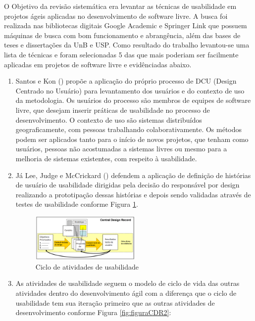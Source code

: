 O Objetivo da revisão sistemática era levantar as técnicas de usabilidade em projetos ágeis aplicadas no desenvolvimento de software livre. A busca foi realizada nas bibliotecas digitais Google Academic e Springer Link que possuem máquinas de busca com bom funcionamento e abrangência, além das bases de teses e dissertações da UnB e USP. Como resultado do trabalho levantou-se uma lista de técnicas e foram selecionadas 5 das que mais poderiam ser facilmente aplicadas em projetos de software livre e evidênciadas abaixo.

\begin{enumerate}
%
\item Santos e Kon (\citeyear{santoskon2009}) propõe a aplicação do próprio processo de DCU (Design Centrado no Usuário) para levantamento dos usuários e do contexto de uso da metodologia. Os usuários do processo são membros de equipes de software livre, que desejam inserir práticas de usabilidade no processo de desenvolvimento. O contexto de uso são sistemas distribuídos geograficamente, com pessoas trabalhando colaborativamente. Os métodos podem ser aplicados tanto para o início de novos projetos, que tenham como usuários, pessoas não acostumadas a sistemas livres ou mesmo para a melhoria de sistemas existentes, com respeito à usabilidade.

%
\item Já Lee, Judge e McCrickard (\citeyear{lee2011}) defendem a aplicação de definição de histórias de usuário de usabilidade dirigidas pela decisão do responsável por design realizando a prototipação dessas histórias e depois sendo validadas através de testes de usabilidade conforme Figura \ref{fig:figuraCDR}.

\begin{figure}[H]
  \begin{center}
    \includegraphics[width=0.5\textwidth]{figuras/figuraCDRBR.eps}
    \caption{Ciclo de atividades de usabilidade}
    \label{fig:figuraCDR}
  \end{center}
\end{figure}

%
\item As atividades de usabilidade seguem o modelo de ciclo de vida das outras atividades dentro do desenvolvimento ágil com a diferença que o ciclo de usabilidade tem sua iteração primeiro que as outras atividades de desenvolvimento conforme Figura \ref{fig:figuraCDR2}:


\end{enumerate}
